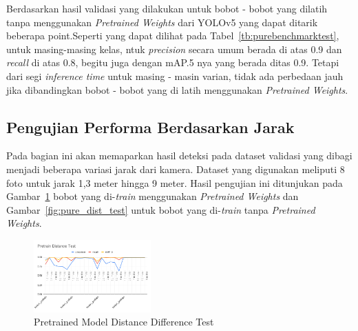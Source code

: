 
\par Berdasarkan hasil validasi yang dilakukan untuk bobot - bobot yang dilatih tanpa menggunakan \emph{Pretrained Weights} dari YOLOv5 yang dapat ditarik beberapa point.Seperti yang dapat dilihat pada Tabel~\ref{tb:purebenchmarktest}, untuk masing-masing kelas, ntuk \emph{precision} secara umum berada di atas 0.9 dan \emph{recall} di atas 0.8, begitu juga dengan mAP.5 nya yang berada ditas 0.9. Tetapi dari segi \emph{inference time} untuk masing - masin varian, tidak ada perbedaan jauh jika dibandingkan bobot - bobot yang di latih menggunakan \emph{Pretrained Weights}.

\subsection{Pengujian Performa Berdasarkan Jarak}
\label{subsec:model_rangetest}

\par Pada bagian ini akan memaparkan hasil deteksi pada dataset validasi yang dibagi menjadi beberapa variasi jarak dari kamera. Dataset yang digunakan meliputi 8 foto untuk jarak 1,3 meter hingga 9 meter. Hasil pengujian ini ditunjukan pada Gambar~\ref{fig:pretrain_dist_test} bobot yang di-\emph{train} menggunakan \emph{Pretrained Weights} dan  Gambar~\ref{fig:pure_dist_test} untuk bobot yang di-\emph{train} tanpa \emph{Pretrained Weights}.
 
\begin{figure}[ht]
  \centering
  \includegraphics[width=0.4\textwidth]{gambar/utilities/pretain_dist_test.png}
  \caption{Pretrained Model Distance Difference Test}
  \label{fig:pretrain_dist_test}  
\end{figure}

